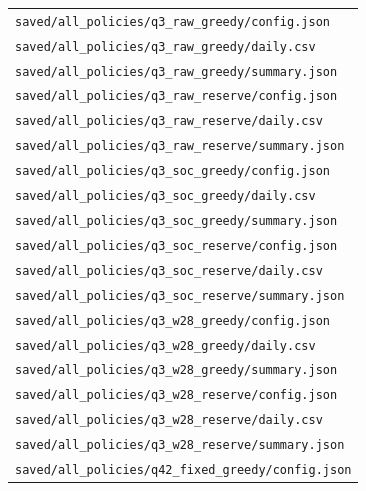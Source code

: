\begin{longtable}{p{}}
\nolinkurl{saved/all_policies/q3_raw_greedy/config.json} \\

\nolinkurl{saved/all_policies/q3_raw_greedy/daily.csv} \\

\nolinkurl{saved/all_policies/q3_raw_greedy/summary.json} \\

\nolinkurl{saved/all_policies/q3_raw_reserve/config.json} \\

\nolinkurl{saved/all_policies/q3_raw_reserve/daily.csv} \\

\nolinkurl{saved/all_policies/q3_raw_reserve/summary.json} \\

\nolinkurl{saved/all_policies/q3_soc_greedy/config.json} \\

\nolinkurl{saved/all_policies/q3_soc_greedy/daily.csv} \\

\nolinkurl{saved/all_policies/q3_soc_greedy/summary.json} \\

\nolinkurl{saved/all_policies/q3_soc_reserve/config.json} \\

\nolinkurl{saved/all_policies/q3_soc_reserve/daily.csv} \\

\nolinkurl{saved/all_policies/q3_soc_reserve/summary.json} \\

\nolinkurl{saved/all_policies/q3_w28_greedy/config.json} \\

\nolinkurl{saved/all_policies/q3_w28_greedy/daily.csv} \\

\nolinkurl{saved/all_policies/q3_w28_greedy/summary.json} \\

\nolinkurl{saved/all_policies/q3_w28_reserve/config.json} \\

\nolinkurl{saved/all_policies/q3_w28_reserve/daily.csv} \\

\nolinkurl{saved/all_policies/q3_w28_reserve/summary.json} \\

\nolinkurl{saved/all_policies/q42_fixed_greedy/config.json} \\


\end{longtable}
